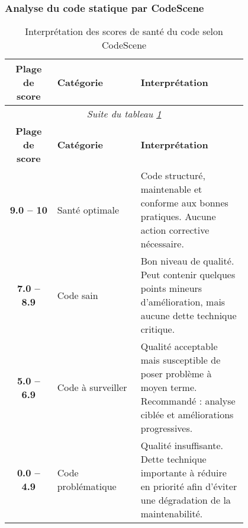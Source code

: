 \subsubsection{Analyse du code statique par CodeScene} \label{sec:codescene}

\begin{longtable}{|c|p{0.35\linewidth}|p{0.45\linewidth}|}
\caption{\label{tab:codescene_thresholds} Interprétation des scores de santé du code selon CodeScene} \\
\hline
\textbf{Plage de score} & \textbf{Catégorie} & \textbf{Interprétation} \\
\hline
\endfirsthead

\multicolumn{3}{c}{\textit{Suite du tableau \ref{tab:codescene_thresholds}}} \\
\hline
\textbf{Plage de score} & \textbf{Catégorie} & \textbf{Interprétation} \\
\hline
\endhead

\hline
\textbf{9.0 -- 10} & Santé optimale & Code structuré, maintenable et conforme aux bonnes pratiques. Aucune action corrective nécessaire. \\
\hline
\textbf{7.0 -- 8.9} & Code sain & Bon niveau de qualité. Peut contenir quelques points mineurs d’amélioration, mais aucune dette technique critique. \\
\hline
\textbf{5.0 -- 6.9} & Code à surveiller & Qualité acceptable mais susceptible de poser problème à moyen terme. Recommandé : analyse ciblée et améliorations progressives. \\
\hline
\textbf{0.0 -- 4.9} & Code problématique & Qualité insuffisante. Dette technique importante à réduire en priorité afin d’éviter une dégradation de la maintenabilité. \\
\hline
\end{longtable}
